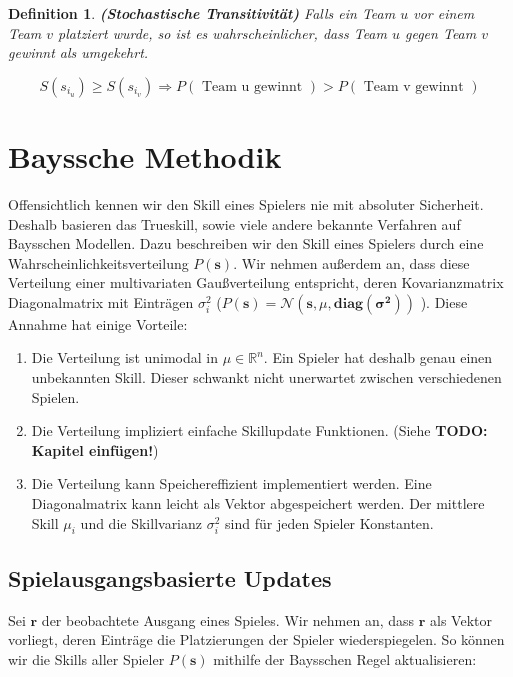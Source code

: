\documentclass[12pt,a4paper]{scrartcl}
\newtheorem{Definition}[Satz]{Definition}
\numberwithin{equation}{section}
\newcommand{\R}{\mathbb{R}} %
\begin{document}
\begin{Definition}\textbf{(Stochastische Transitivität)}
Falls ein Team $u$ vor einem Team $v$ platziert wurde, so ist es wahrscheinlicher, dass Team $u$ gegen Team $v$ gewinnt als umgekehrt.

\begin{equation}
 S(s_{i_{u}}) \geq S(s_{i_{v}}) \Rightarrow P(\text{ Team u gewinnt }) > P(\text{ Team v gewinnt })
\end{equation}

\end{Definition}

\section{Bayssche Methodik}

Offensichtlich kennen wir den Skill eines Spielers nie mit absoluter Sicherheit. Deshalb basieren das Trueskill, sowie viele andere bekannte Verfahren auf Baysschen Modellen. Dazu beschreiben wir den Skill eines
Spielers durch eine Wahrscheinlichkeitsverteilung $P(\textbf{s})$. Wir nehmen außerdem an, dass diese Verteilung einer multivariaten Gaußverteilung entspricht, deren Kovarianzmatrix
Diagonalmatrix mit Einträgen $\sigma_i^2$ ($P(\mathbf{s}) = \mathcal{N}(\mathbf{s},\mathbb{\mu},\mathbf{diag(\sigma^2)})$ ). Diese Annahme hat einige Vorteile: 
\begin{enumerate}
 \item Die Verteilung ist unimodal in $\mu \in \R^n$. Ein Spieler hat deshalb genau einen unbekannten Skill. Dieser schwankt nicht unerwartet zwischen verschiedenen Spielen.
 \item Die Verteilung impliziert einfache Skillupdate Funktionen. (Siehe \textbf{TODO: Kapitel einfügen!})
 \item Die Verteilung kann Speichereffizient implementiert werden. Eine Diagonalmatrix kann leicht als Vektor abgespeichert werden. Der mittlere Skill $\mu_i$ und die Skillvarianz $\sigma_i^2$ sind für jeden Spieler 
 Konstanten.
\end{enumerate}

\subsection{Spielausgangsbasierte Updates}
Sei $\mathbf{r}$ der beobachtete Ausgang eines Spieles. Wir nehmen an, dass $\mathbf{r}$ als Vektor vorliegt, deren Einträge die Platzierungen der Spieler wiederspiegelen. So können wir die Skills aller Spieler $P(\textbf{s})$
mithilfe der Baysschen Regel aktualisieren: 
\end{document}
